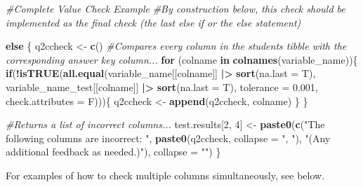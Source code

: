 \documentclass[
  12pt,
]{book}
\newenvironment{Shaded}{\begin{snugshade}}{\end{snugshade}}
\newcommand{\AttributeTok}[1]{\textcolor[rgb]{0.13,0.29,0.53}{#1}}
\newcommand{\CommentTok}[1]{\textcolor[rgb]{0.56,0.35,0.01}{\textit{#1}}}
\newcommand{\ControlFlowTok}[1]{\textcolor[rgb]{0.13,0.29,0.53}{\textbf{#1}}}
\newcommand{\DecValTok}[1]{\textcolor[rgb]{0.00,0.00,0.81}{#1}}
\newcommand{\FloatTok}[1]{\textcolor[rgb]{0.00,0.00,0.81}{#1}}
\newcommand{\FunctionTok}[1]{\textcolor[rgb]{0.13,0.29,0.53}{\textbf{#1}}}
\newcommand{\NormalTok}[1]{#1}
\newcommand{\OtherTok}[1]{\textcolor[rgb]{0.56,0.35,0.01}{#1}}
\newcommand{\SpecialCharTok}[1]{\textcolor[rgb]{0.81,0.36,0.00}{\textbf{#1}}}
\newcommand{\StringTok}[1]{\textcolor[rgb]{0.31,0.60,0.02}{#1}}
\begin{document}
\begin{Shaded}
\begin{Highlighting}[]
\CommentTok{\#Complete Value Check Example}
\CommentTok{\#By construction below, this check should be implemented as the final check (the last \textasciigrave{}else if\textasciigrave{} or the \textasciigrave{}else\textasciigrave{} statement)}

\ControlFlowTok{else}\NormalTok{ \{ }
\NormalTok{  q2ccheck }\OtherTok{\textless{}{-}} \FunctionTok{c}\NormalTok{()}
      \CommentTok{\#Compares every column in the student\textquotesingle{}s tibble with the corresponding answer key column...}
      \ControlFlowTok{for}\NormalTok{ (colname }\ControlFlowTok{in} \FunctionTok{colnames}\NormalTok{(variable\_name))\{ }
        \ControlFlowTok{if}\NormalTok{(}\SpecialCharTok{!}\FunctionTok{isTRUE}\NormalTok{(}\FunctionTok{all.equal}\NormalTok{(variable\_name[[colname]] }\SpecialCharTok{|\textgreater{}} \FunctionTok{sort}\NormalTok{(}\AttributeTok{na.last =}\NormalTok{ T), }
\NormalTok{                             variable\_name\_test[[colname]] }\SpecialCharTok{|\textgreater{}} \FunctionTok{sort}\NormalTok{(}\AttributeTok{na.last =}\NormalTok{ T),}
                             \AttributeTok{tolerance =} \FloatTok{0.001}\NormalTok{,}
                             \AttributeTok{check.attributes =}\NormalTok{ F)))\{}
\NormalTok{          q2ccheck }\OtherTok{\textless{}{-}} \FunctionTok{append}\NormalTok{(q2ccheck, colname)}
\NormalTok{        \}}
\NormalTok{      \}}
  
\CommentTok{\#Returns a list of incorrect columns... }
\NormalTok{  test.results[}\DecValTok{2}\NormalTok{, }\DecValTok{4}\NormalTok{] }\OtherTok{\textless{}{-}} \FunctionTok{paste0}\NormalTok{(}\FunctionTok{c}\NormalTok{(}\StringTok{"The following columns are incorrect: "}\NormalTok{,}
                                \FunctionTok{paste0}\NormalTok{(q2ccheck, }\AttributeTok{collapse =} \StringTok{", "}\NormalTok{),}
                                \StringTok{"(Any additional feedback as needed.)"}\NormalTok{), }\AttributeTok{collapse =} \StringTok{""}\NormalTok{)}
\NormalTok{\}}
\end{Highlighting}
\end{Shaded}

For examples of how to check multiple columns simultaneously, see below.
\end{document}
